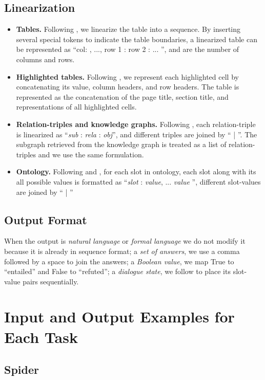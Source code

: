 \documentclass[11pt]{article}
\begin{document}
\subsection{Linearization}
\begin{itemize}[leftmargin=*]
    \item \textbf{Tables.} Following \citet{liu2021tapex},  we linearize the table into a sequence. By inserting several special tokens to indicate the table boundaries, a  linearized table can be represented as ``col: , ...,  row 1 :  row 2 : ...  '',  and  are the number of columns and rows.
\item \textbf{Highlighted tables.} Following \citet{parikh2020totto}, we represent each highlighted cell by concatenating its value, column headers, and row headers. The table is represented as the concatenation of the page title, section title, and representations of all highlighted cells. 
\item \textbf{Relation-triples and knowledge graphs.} Following \citet{nan2021dart}, each relation-triple is linearized as ``\textit{sub} : \textit{rela} : \textit{obj}'', and different triples are joined by `` | ''. 
The subgraph retrieved from the knowledge graph is treated as a list of relation-triples and we use the same formulation. 
    \item \textbf{Ontology.} Following \citet{hosseini2020simple} and \citet{lin2021leveraging}, for each slot in ontology, each slot along with its all possible values is formatted as ``\textit{slot} : \textit{value}, ... \textit{value} '', different slot-values are joined by `` | '' \end{itemize}

\subsection{Output Format}
When the output is \textit{natural language} or \textit{formal language} we do not modify it because it is already in sequence format; 
a \textit{set of answers}, we use a comma followed by a space to join the answers; a \textit{Boolean value}, we map True to ``entailed'' and False to ``refuted''; 
a \textit{dialogue state}, we follow \citet{hosseini2020simple} to place its slot-value pairs sequentially. 
\section{Input and Output Examples for Each Task}
\label{app:examples}
\subsection{Spider}
\end{document}
